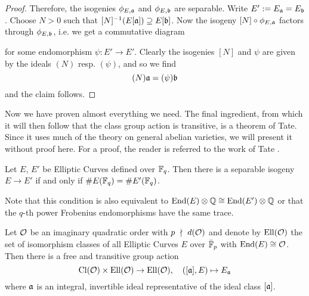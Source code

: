 \begin{proof}
    Therefore, the isogenies $\phi_{E, \mathfrak{a}}$ and $\phi_{E, \mathfrak{b}}$ are separable.
    Write $E' := E_{\mathfrak{a}} = E_{\mathfrak{b}}$.
    Choose $N > 0$ such that $[N]^{-1}(E[\mathfrak{a}]) \supseteq E[\mathfrak{b}]$.
    Now the isogeny $[N] \circ \phi_{E, \mathfrak{a}}$ factors through $\phi_{E, \mathfrak{b}}$, i.e. we get a commutative diagram
    \begin{center}
    \end{center}
    for some endomorphism $\psi: E' \to E'$.
    Clearly the isogenies $[N]$ and $\psi$ are given by the ideals $(N)$ resp. $(\psi)$, and so we find
    \begin{equation*}
        (N)\mathfrak{a} = (\psi)\mathfrak{b}
    \end{equation*}
    and the claim follows.
\end{proof}
Now we have proven almost everything we need.
The final ingredient, from which it will then follow that the class group action is transitive, is a theorem of Tate.
Since it uses much of the theory on general abelian varieties, we will present it without proof here.
For a proof, the reader is referred to the work of Tate \cite{tate}.
\begin{theorem}
    \label{prop:isogeny_theorem}
    Let $E$, $E'$ be Elliptic Curves defined over $\mathbb{F}_q$.
    Then there is a separable isogeny $E \to E'$ if and only if $\#E(\mathbb{F}_q) = \#E'(\mathbb{F}_q)$.
\end{theorem}
Note that this condition is also equivalent to $\mathrm{End}(E) \otimes \mathbb{Q} \cong \mathrm{End}(E') \otimes \mathbb{Q}$ or that the $q$-th power Frobenius endomorphisms have the same trace. 
\begin{theorem}
    \label{prop:class_group_action}
    Let $\mathcal{O}$ be an imaginary quadratic order with $p \ \nmid \  d(\mathcal{O})$ and denote by $\mathrm{Ell}(\mathcal{O})$ the set of isomorphism classes of all Elliptic Curves $E$ over $\bar{\mathbb{F}}_p$ with $\mathrm{End}(E) \cong \mathcal{O}$.
    Then there is a free and transitive group action
    \begin{equation*}
        \mathrm{Cl}(\mathcal{O}) \times \mathrm{Ell}(\mathcal{O}) \to \mathrm{Ell}(\mathcal{O}), \quad ([\mathfrak{a}], E) \mapsto E_{\mathfrak{a}}
    \end{equation*}
    where $\mathfrak{a}$ is an integral, invertible ideal representative of the ideal class $[\mathfrak{a}]$.
\end{theorem}
